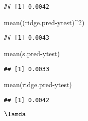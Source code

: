 \documentclass[
]{article}
\newenvironment{Shaded}{\begin{snugshade}}{\end{snugshade}}
\newcommand{\AttributeTok}[1]{\textcolor[rgb]{0.77,0.63,0.00}{#1}}
\newcommand{\DecValTok}[1]{\textcolor[rgb]{0.00,0.00,0.81}{#1}}
\newcommand{\FunctionTok}[1]{\textcolor[rgb]{0.00,0.00,0.00}{#1}}
\newcommand{\NormalTok}[1]{#1}
\newcommand{\OtherTok}[1]{\textcolor[rgb]{0.56,0.35,0.01}{#1}}
\newcommand{\SpecialCharTok}[1]{\textcolor[rgb]{0.00,0.00,0.00}{#1}}
\newcommand{\StringTok}[1]{\textcolor[rgb]{0.31,0.60,0.02}{#1}}
\begin{document}
\begin{verbatim}
## [1] 0.0042
\end{verbatim}

\begin{Shaded}
\begin{Highlighting}[]
\FunctionTok{mean}\NormalTok{((ridge.pred}\SpecialCharTok{{-}}\NormalTok{ytest)}\SpecialCharTok{\^{}}\DecValTok{2}\NormalTok{)}
\end{Highlighting}
\end{Shaded}

\begin{verbatim}
## [1] 0.0043
\end{verbatim}

\begin{Shaded}
\begin{Highlighting}[]
\FunctionTok{mean}\NormalTok{(s.pred}\SpecialCharTok{{-}}\NormalTok{ytest)}
\end{Highlighting}
\end{Shaded}

\begin{verbatim}
## [1] 0.0033
\end{verbatim}

\begin{Shaded}
\begin{Highlighting}[]
\FunctionTok{mean}\NormalTok{(ridge.pred}\SpecialCharTok{{-}}\NormalTok{ytest)}
\end{Highlighting}
\end{Shaded}

\begin{verbatim}
## [1] 0.0042
\end{verbatim}

\begin{Shaded}
\end{Shaded}

\(\lamda\)

\begin{Shaded}
\end{Shaded}
\end{document}
